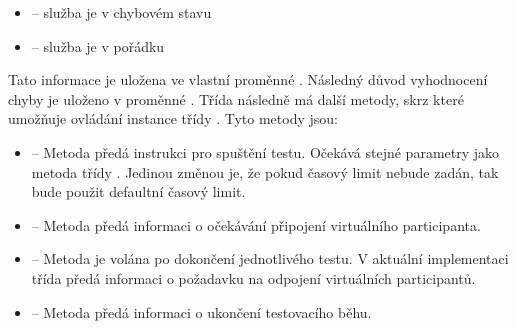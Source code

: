 \begin{itemize}
    \item {} -- služba je v chybovém stavu
    \item {}  -- služba je v pořádku  
\end{itemize}

Tato informace je uložena ve vlastní proměnné . Následný důvod vyhodnocení chyby je uloženo v proměnné . Třída následně má další metody, skrz které umožňuje ovládání instance třídy . Tyto metody jsou:

\begin{itemize}
    \item {} -- Metoda předá instrukci pro spuštění testu. Očekává stejné parametry jako metoda  třídy . Jedinou změnou je, že pokud časový limit nebude zadán, tak bude použit defaultní časový limit.
    \item {} -- Metoda předá informaci o očekávání připojení virtuálního participanta.
    \item {} -- Metoda je volána po dokončení jednotlivého testu. V aktuální implementaci třída předá informaci o požadavku na odpojení virtuálních participantů.
    \item {} -- Metoda předá informaci o ukončení testovacího běhu.
\end{itemize}

